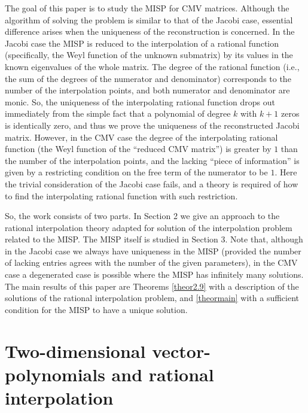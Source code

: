 \documentclass{amsart}
\begin{document}
\medskip

The goal of this paper is to study the MISP for CMV matrices.
Although the algorithm of solving the problem is similar to that
of the Jacobi case, essential difference arises when the
uniqueness of the reconstruction is concerned. In the Jacobi case
the MISP is reduced to the interpolation of a rational function
(specifically, the Weyl function of the unknown submatrix) by its
values in the known eigenvalues of the whole matrix. The degree of
the rational function (i.e., the sum of the degrees of the
numerator and denominator) corresponds to the number of the
interpolation points, and both numerator and denominator are
monic. So, the uniqueness of the interpolating rational function
drops out immediately from the simple fact that a polynomial of
degree $k$ with $k+1$ zeros is identically zero, and thus we prove
the uniqueness of the reconstructed Jacobi matrix. However, in the
CMV case the degree of the interpolating rational function (the
Weyl function of the ``reduced CMV matrix'') is greater by $1$
than the number of the interpolation points, and the lacking
``piece of information'' is given by a restricting condition on
the free term of the numerator to be $1$. Here the trivial
consideration of the Jacobi case fails, and a theory is required
of how to find the interpolating rational function with such
restriction.

So, the work consists of two parts. In Section 2 we give an
approach to the rational interpolation theory adapted for solution
of the interpolation problem related to the MISP. The MISP itself
is studied in Section 3. Note that, although in the Jacobi case we
always have uniqueness in the MISP (provided the number of lacking
entries agrees with the number of the given parameters), in the
CMV case a degenerated case is possible where the MISP has
infinitely many solutions. The main results of this paper are
Theorems \ref{theor2.9} with a description of the solutions of the
rational interpolation problem, and \ref{theormain} with a
sufficient condition for the MISP to have a unique solution.

\setcounter{section}{1} \setcounter{equation}{0}
\section {Two-dimensional vector-polynomials and rational interpolation}
\end{document}
